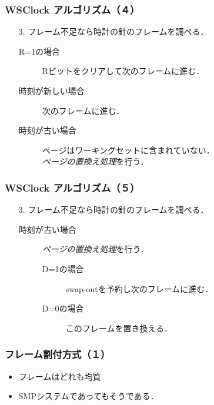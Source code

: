\documentclass{beamer}                   %
\begin{document}
\begin{frame}
  \frametitle{WSClock アルゴリズム（４）}


  \begin{enumerate}
  \item[3.] フレーム不足なら時計の針のフレームを調べる．
    \begin{description}
    \item[R=1の場合]
      Rビットをクリアして次のフレームに進む．
    \item[時刻が新しい場合]
      次のフレームに進む．
    \item[時刻が古い場合]
      ページはワーキングセットに含まれていない．\\
      \emph{ページの置換え処理}を行う．
    \end{description}
  \end{enumerate}
\end{frame}

\begin{frame}
  \frametitle{WSClock アルゴリズム（５）}


  \begin{enumerate}
  \item[3.] フレーム不足なら時計の針のフレームを調べる．
    \begin{description}
    \item[時刻が古い場合] \emph{ページの置換え処理}を行う．
      \begin{description}
      \item[D=1の場合]
        swap-outを予約し次のフレームに進む．
      \item[D=0の場合]
        このフレームを置き換える．
      \end{description}
    \end{description}
  \end{enumerate}
\end{frame}

\begin{frame}
  \frametitle{フレーム割付方式（１）}
  \begin{itemize}
  \item フレームはどれも均質
  \item SMPシステムであってもそうである．
  \end{itemize}
\end{frame}
\end{document}

